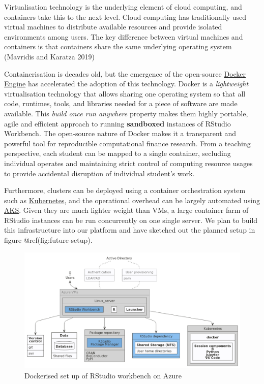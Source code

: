 \documentclass{article}
\begin{document}
Virtualisation technology is the underlying element of cloud computing,
and containers take this to the next level. Cloud computing has
traditionally used virtual machines to distribute available resources
and provide isolated environments among users. The key difference
between virtual machines and containers is that containers share the
same underlying operating system (Mavridis and Karatza 2019)

Containerisation is decades old, but the emergence of the open-source
\href{https://www.ibm.com/cloud/learn/docker}{Docker Engine} has
accelerated the adoption of this technology. Docker is a
\emph{lightweight} virtualisation technology that allows sharing one
operating system so that all code, runtimes, tools, and libraries needed
for a piece of software are made available. This \emph{build once run
anywhere} property makes them highly portable, agile and efficient
approach to running \textbf{sandboxed} instances of RStudio Workbench.
The open-source nature of Docker makes it a transparent and powerful
tool for reproducible computational finance research. From a teaching
perspective, each student can be mapped to a single container, secluding
individual operates and maintaining strict control of computing resource
usages to provide accidental disruption of individual student's work.

Furthermore, clusters can be deployed using a container orchestration
system such as
\href{https://www.ibm.com/cloud/learn/kubernetes}{Kubernetes}, and the
operational overhead can be largely automated using
\href{https://docs.microsoft.com/en-us/azure/aks/intro-kubernetes}{AKS}.
Given they are much lighter weight than VMs, a large container farm of
RStudio instances can be run concurrently on one single server. We plan
to build this infrastructure into our platform and have sketched out the
planned setup in figure @ref(fig:future-setup).

\begin{figure}

{\centering \includegraphics[width=0.8\linewidth]{img/rstudiowb_kb} 

}

\caption{Dockerised set up of RStudio workbench on Azure}\label{fig:future-setup}
\end{figure}
\end{document}

